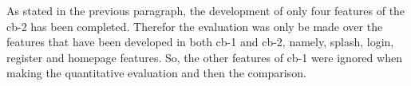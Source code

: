 As stated in the previous paragraph, the development of only four features of the cb-2 has been completed. Therefor the evaluation was only be made over the features that have been developed in both cb-1 and cb-2, namely, splash, login, register and homepage features. So, the other features of cb-1 were ignored when making the quantitative evaluation and then the comparison.



